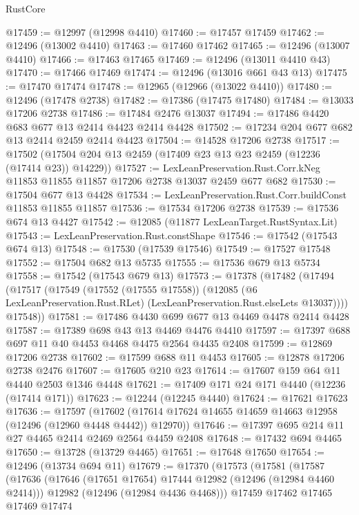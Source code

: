 \begin{lexlean}{RustCore}
\begin{coremodule}
@17459 := @12997 (@12998 @4410)
@17460 := @17457 @17459
@17462 := @12496 (@13002 @4410)
@17463 := @17460 @17462
@17465 := @12496 (@13007 @4410)
@17466 := @17463 @17465
@17469 := @12496 (@13011 @4410 @43)
@17470 := @17466 @17469
@17474 := @12496 (@13016 @661 @43 @13)
@17475 := @17470 @17474
@17478 := @12965 (@12966 (@13022 @4410))
@17480 := @12496 (@17478 @2738)
@17482 := @17386 (@17475 @17480)
@17484 := @13033 @17206 @2738
@17486 := @17484 @2476 @13037
@17494 := @17486 @4420 @683 @677 @13 @2414 @4423 @2414 @4428
@17502 := @17234 @204 @677 @682 @13 @2414 @2459 @2414 @4423
@17504 := @14528 @17206 @2738
@17517 := @17502 (@17504 @204 @13 @2459 (@17409 @23 @13 @23 @2459 (@12236 (@17414 @23)) @14229))
@17527 := LexLeanPreservation.Rust.Corr.kNeg
    @11853
    @11855
    @11857
    @17206
    @2738
    @13037
    @2459
    @677
    @682
@17530 := @17504 @677 @13 @4428
@17534 := LexLeanPreservation.Rust.Corr.buildConst @11853 @11855 @11857
@17536 := @17534 @17206 @2738
@17539 := @17536 @674 @13 @4427
@17542 := @12085 (@11877 LexLeanTarget.RustSyntax.Lit)
@17543 := LexLeanPreservation.Rust.constShape
@17546 := @17542 (@17543 @674 @13)
@17548 := @17530 (@17539 @17546)
@17549 := @17527 @17548
@17552 := @17504 @682 @13 @5735
@17555 := @17536 @679 @13 @5734
@17558 := @17542 (@17543 @679 @13)
@17573 := @17378
    (@17482
      (@17494
        (@17517
          (@17549
            (@17552 (@17555 @17558))
            (@12085 (@6 LexLeanPreservation.Rust.RLet) (LexLeanPreservation.Rust.elseLets @13037))))
        @17548))
@17581 := @17486 @4430 @699 @677 @13 @4469 @4478 @2414 @4428
@17587 := @17389 @698 @43 @13 @4469 @4476 @4410
@17597 := @17397 @688 @697 @11 @40 @4453 @4468 @4475 @2564 @4435 @2408
@17599 := @12869 @17206 @2738
@17602 := @17599 @688 @11 @4453
@17605 := @12878 @17206 @2738 @2476
@17607 := @17605 @210 @23
@17614 := @17607 @159 @64 @11 @4440 @2503 @1346 @4448
@17621 := @17409 @171 @24 @171 @4440 (@12236 (@17414 @171))
@17623 := @12244 (@12245 @4440)
@17624 := @17621 @17623
@17636 := @17597
    (@17602 (@17614 @17624 @14655 @14659 @14663 @12958 (@12496 (@12960 @4448 @4442)) @12970))
@17646 := @17397 @695 @214 @11 @27 @4465 @2414 @2469 @2564 @4459 @2408
@17648 := @17432 @694 @4465
@17650 := @13728 (@13729 @4465)
@17651 := @17648 @17650
@17654 := @12496 (@13734 @694 @11)
@17679 := @17370
    (@17573
      (@17581
        (@17587
          (@17636
            (@17646 (@17651 @17654) @17444 @12982 (@12496 (@12984 @4460 @2414)))
            @12982
            (@12496 (@12984 @4436 @4468)))
          @17459
          @17462
          @17465
          @17469
          @17474

\end{coremodule}
\end{lexlean}
